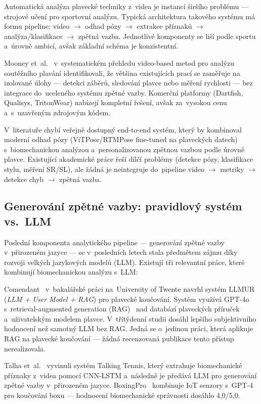 Automatická analýza plavecké techniky z~videa je instancí širšího problému --- strojové učení pro sportovní analýzu. Typická architektura takového systému má formu pipeline: video $\rightarrow$ odhad pózy $\rightarrow$ extrakce příznaků $\rightarrow$ analýza/klasifikace $\rightarrow$ zpětná vazba. Jednotlivé komponenty se liší podle sportu a~úrovně ambicí, avšak základní schéma je konzistentní.

Mooney et~al.~\cite{mooney2016review} v~systematickém přehledu video-based metod pro analýzu soutěžního plavání identifikovali, že většina existujících prací se zaměřuje na izolované úlohy --- detekci záběrů, sledování plavce nebo měření rychlosti --- bez integrace do~uceleného systému zpětné vazby. Komerční platformy (Dartfish, Qualisys, TritonWear) nabízejí kompletní řešení, avšak za~vysokou cenu a~s~uzavřeným zdrojovým kódem.

V~literatuře chybí veřejně dostupný end-to-end systém, který by kombinoval moderní odhad pózy (ViTPose/RTMPose fine-tuned na plaveckých datech) s~biomechanickou analýzou a~personalizovanou zpětnou vazbou podle úrovně plavce. Existující akademické práce řeší dílčí problémy (detekce pózy, klasifikace stylu, měření SR/SL), ale žádná je neintegruje do~pipeline video $\rightarrow$ metriky $\rightarrow$ detekce chyb $\rightarrow$ zpětná vazba.

\subsection{Generování zpětné vazby: pravidlový systém vs.\ LLM}
\label{subsec:feedback_llm}

Poslední komponenta analytického pipeline --- generování zpětné vazby v~přirozeném jazyce --- se v~posledních letech stala předmětem zájmu díky rozvoji velkých jazykových modelů (LLM). Existují tři relevantní práce, které kombinují biomechanickou analýzu s~LLM:

Comendant~\cite{comendant2024} v~bakalářské práci na~University of Twente navrhl systém LLMUR (\textit{LLM + User Model + RAG}) pro plavecké koučování. Systém využívá GPT-4o s~retrieval-augmented generation (RAG)~\cite{lewis2020rag} nad databází plaveckých příruček a~uživatelským modelem plavce. V~třítýdenní studii dosáhl lepšího subjektivního hodnocení než samotný LLM bez RAG. Jedná se o~jedinou práci, která aplikuje RAG na plavecké koučování --- žádná recenzovaná publikace tento přístup nerealizovala.

Talha et~al.~\cite{talha2025} vyvinuli systém Talking Tennis, který extrahuje biomechanické příznaky z~videa pomocí CNN-LSTM a~následně je předává LLM pro generování zpětné vazby v~přirozeném jazyce. BoxingPro~\cite{boxingpro2024} kombinuje IoT senzory s~GPT-4 pro koučování boxu --- hodnocení biomechanické správnosti dosáhlo 4{,}0/5{,}0.

